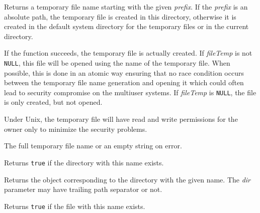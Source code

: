 Returns a temporary file name starting with the given {\it prefix}. If
the {\it prefix} is an absolute path, the temporary file is created in this
directory, otherwise it is created in the default system directory for the
temporary files or in the current directory.

If the function succeeds, the temporary file is actually created. If\rtfsp
{\it fileTemp} is not {\tt NULL}, this file will be opened using the name of
the temporary file. When possible, this is done in an atomic way ensuring that
no race condition occurs between the temporary file name generation and opening
it which could often lead to security compromise on the multiuser systems.
If {\it fileTemp} is {\tt NULL}, the file is only created, but not opened.

Under Unix, the temporary file will have read and write permissions for the
owner only to minimize the security problems.





The full temporary file name or an empty string on error.

\label{wxfilenamedirexists}



Returns {\tt true} if the directory with this name exists.

\label{wxfilenamedirname}


Returns the object corresponding to the directory with the given name.
The {\it dir} parameter may have trailing path separator or not.


\label{wxfilenamefileexists}



Returns {\tt true} if the file with this name exists.

